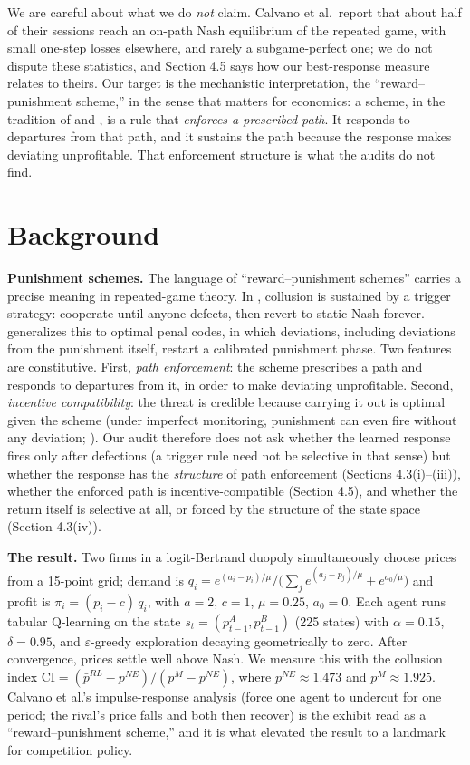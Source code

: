 \documentclass[sigconf]{acmart}
\begin{document}
We are careful about what we do \emph{not} claim. Calvano et al.~report
that about half of their sessions reach an on-path Nash equilibrium of
the repeated game, with small one-step losses elsewhere, and rarely a
subgame-perfect one; we do not dispute these statistics, and Section 4.5
says how our best-response measure relates to theirs. Our target is the
mechanistic interpretation, the ``reward--punishment scheme,'' in the
sense that matters for economics: a scheme, in the tradition of
\citet{friedman1971} and \citet{abreu1988}, is a rule that
\emph{enforces a prescribed path}. It responds to departures from that
path, and it sustains the path because the response makes deviating
unprofitable. That enforcement structure is what the audits do not find.

\section{Background}\label{background}

\textbf{Punishment schemes.} The language of ``reward--punishment
schemes'' carries a precise meaning in repeated-game theory. In
\citet{friedman1971}, collusion is sustained by a trigger strategy:
cooperate until anyone defects, then revert to static Nash forever.
\citet{abreu1988} generalizes this to optimal penal codes, in which
deviations, including deviations from the punishment itself, restart a
calibrated punishment phase. Two features are constitutive. First,
\emph{path enforcement}: the scheme prescribes a path and responds to
departures from it, in order to make deviating unprofitable. Second,
\emph{incentive compatibility}: the threat is credible because carrying
it out is optimal given the scheme (under imperfect monitoring,
punishment can even fire without any deviation; \citet{green1984}). Our
audit therefore does not ask whether the learned response fires only
after defections (a trigger rule need not be selective in that sense)
but whether the response has the \emph{structure} of path enforcement
(Sections 4.3(i)--(iii)), whether the enforced path is
incentive-compatible (Section 4.5), and whether the return itself is
selective at all, or forced by the structure of the state space (Section
4.3(iv)).

\textbf{The \citet{calvano2020} result.} Two firms in a logit-Bertrand
duopoly simultaneously choose prices from a 15-point grid; demand is
\(q_i = e^{(a_i-p_i)/\mu} / \big(\sum_j e^{(a_j-p_j)/\mu} + e^{a_0/\mu}\big)\)
and profit is \(\pi_i = (p_i - c)\,q_i\), with \(a=2\), \(c=1\),
\(\mu=0.25\), \(a_0=0\). Each agent runs tabular Q-learning
\citep{watkins1992} on the state \(s_t = (p^A_{t-1}, p^B_{t-1})\) (225
states) with \(\alpha = 0.15\), \(\delta = 0.95\), and
\ensuremath{\varepsilon}-greedy exploration decaying geometrically to
zero. After convergence, prices settle well above Nash. We measure this
with the collusion index
\(\mathrm{CI} = (\bar{p}^{RL} - p^{NE})/(p^{M} - p^{NE})\), where
\(p^{NE} \approx 1.473\) and \(p^{M} \approx 1.925\). Calvano et al.'s
impulse-response analysis (force one agent to undercut for one period;
the rival's price falls and both then recover) is the exhibit read as a
``reward--punishment scheme,'' and it is what elevated the result to a
landmark for competition policy.
\end{document}
